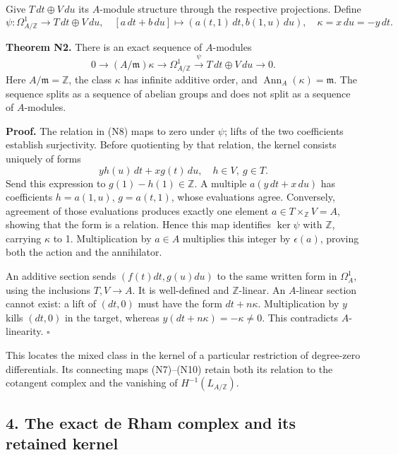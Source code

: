 \documentclass[
]{article}
\begin{document}
Give \(T\,dt\oplus V\,du\) its \(A\)-module structure through the
respective projections. Define \[
\psi:\Omega^1_{A/\mathbb Z}\longrightarrow T\,dt\oplus V\,du,
\quad [a\,dt+b\,du]\longmapsto(a(t,1)\,dt,b(1,u)\,du),
\quad\kappa=x\,du=-y\,dt.
\tag{N9}
\]

\textbf{Theorem N2.} There is an exact sequence of \(A\)-modules \[
0\longrightarrow(A/\mathfrak m)\kappa
\longrightarrow\Omega^1_{A/\mathbb Z}
\xrightarrow{\psi}T\,dt\oplus V\,du\longrightarrow0.
\tag{N10}
\] Here \(A/\mathfrak m=\mathbb Z\), the class \(\kappa\) has infinite
additive order, and \(\operatorname{Ann}_A(\kappa)=\mathfrak m\). The
sequence splits as a sequence of abelian groups and does not split as a
sequence of \(A\)-modules.

\textbf{Proof.} The relation in (N8) maps to zero under \(\psi\); lifts
of the two coefficients establish surjectivity. Before quotienting by
that relation, the kernel consists uniquely of forms \[
yh(u)\,dt+xg(t)\,du,\quad h\in V,\ g\in T.
\] Send this expression to \(g(1)-h(1)\in\mathbb Z\). A multiple
\(a(y\,dt+x\,du)\) has coefficients \(h=a(1,u)\), \(g=a(t,1)\), whose
evaluations agree. Conversely, agreement of those evaluations produces
exactly one element \(a\in T\times_{\mathbb Z}V=A\), showing that the
form is a relation. Hence this map identifies \(\ker\psi\) with
\(\mathbb Z\), carrying \(\kappa\) to 1. Multiplication by \(a\in A\)
multiplies this integer by \(\epsilon(a)\), proving both the action and
the annihilator.

An additive section sends \((f(t)dt,g(u)du)\) to the same written form
in \(\Omega^1_A\), using the inclusions \(T,V\to A\). It is well-defined
and \(\mathbb Z\)-linear. An \(A\)-linear section cannot exist: a lift
of \((dt,0)\) must have the form \(dt+n\kappa\). Multiplication by \(y\)
kills \((dt,0)\) in the target, whereas \(y(dt+n\kappa)=-\kappa\ne0\).
This contradicts \(A\)-linearity. \(\square\)

This locates the mixed class in the kernel of a particular restriction
of degree-zero differentials. Its connecting maps (N7)--(N10) retain
both its relation to the cotangent complex and the vanishing of
\(H^{-1}(L_{A/\mathbb Z})\).

\subsection{4. The exact de Rham complex and its retained
kernel}\label{the-exact-de-rham-complex-and-its-retained-kernel}
\end{document}
